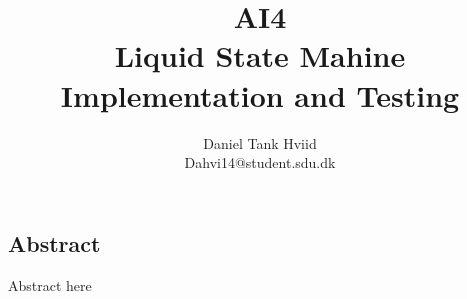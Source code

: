 \documentclass[english,a5paper,oneside, onecolumn,article,9pt]{memoir}
\title{\Huge{AI4} \Large{ \\ Liquid State Mahine \\ Implementation and Testing}}
\author{Daniel Tank Hviid \\ Dahvi14@student.sdu.dk}
\begin{document}
\maketitle
\begin{centering}
\section*{Abstract}
\end{centering}

Abstract here

\tableofcontents
\newpage

\saythanks
{}
















\end{document}

